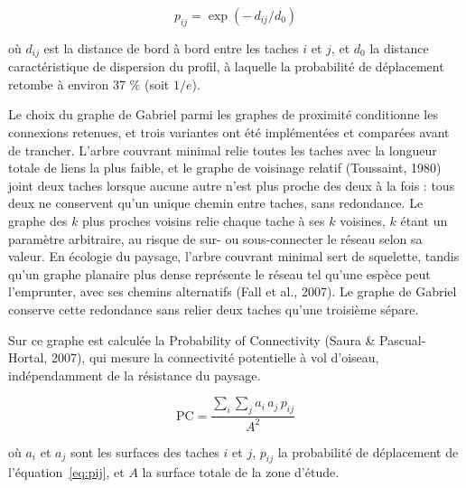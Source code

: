 \documentclass[a4paper,12pt]{report}
\begin{document}
\begin{equation}\label{eq:pij}
p_{ij} = \exp\!\left(-\,d_{ij}/d_0\right)
\end{equation}

où $d_{ij}$ est la distance de bord à bord entre les taches $i$ et $j$, et $d_0$ la distance caractéristique de dispersion du profil, à laquelle la probabilité de déplacement retombe à environ 37 \% (soit $1/e$).

Le choix du graphe de Gabriel parmi les graphes de proximité conditionne les connexions retenues, et trois variantes ont été implémentées et comparées avant de trancher. L'arbre couvrant minimal relie toutes les taches avec la longueur totale de liens la plus faible, et le graphe de voisinage relatif (Toussaint, 1980) joint deux taches lorsque aucune autre n'est plus proche des deux à la fois : tous deux ne conservent qu'un unique chemin entre taches, sans redondance. Le graphe des $k$ plus proches voisins relie chaque tache à ses $k$ voisines, $k$ étant un paramètre arbitraire, au risque de sur- ou sous-connecter le réseau selon sa valeur. En écologie du paysage, l'arbre couvrant minimal sert de squelette, tandis qu'un graphe planaire plus dense représente le réseau tel qu'une espèce peut l'emprunter, avec ses chemins alternatifs (Fall et al., 2007). Le graphe de Gabriel conserve cette redondance sans relier deux taches qu'une troisième sépare.

Sur ce graphe est calculée la Probability of Connectivity (Saura \& Pascual-Hortal, 2007), qui mesure la connectivité potentielle à vol d'oiseau, indépendamment de la résistance du paysage.

\begin{equation}\label{eq:pc}
\mathrm{PC} = \frac{\displaystyle\sum_{i}\sum_{j} a_i\,a_j\,p_{ij}}{A^{2}}
\end{equation}

où $a_i$ et $a_j$ sont les surfaces des taches $i$ et $j$, $p_{ij}$ la probabilité de déplacement de l'équation~\eqref{eq:pij}, et $A$ la surface totale de la zone d'étude.
\end{document}
